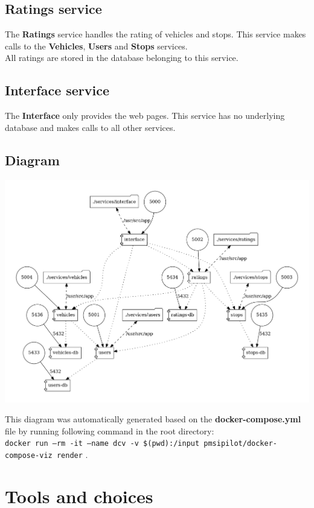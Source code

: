 \documentclass[12pt]{article}
\begin{document}
\subsection{Ratings service}
The \textbf{Ratings} service handles the rating of vehicles and stops. This service makes calls to the \textbf{Vehicles}, \textbf{Users} and \textbf{Stops} services.\\
All ratings are stored in the database belonging to this service.

\subsection{Interface service}
The \textbf{Interface} only provides the web pages. This service has no underlying database and makes calls to all other services.

\subsection{Diagram}
\begin{center}
	\includegraphics[width=\linewidth]{Images/Architecture.png}
\end{center}
This diagram was automatically generated based on the \textbf{docker-compose.yml} file by running following command in the root directory:\\
\texttt{docker run --rm -it --name dcv -v \$(pwd):/input pmsipilot/docker-compose-viz render} .

\newpage

\section{Tools and choices}
\end{document}
